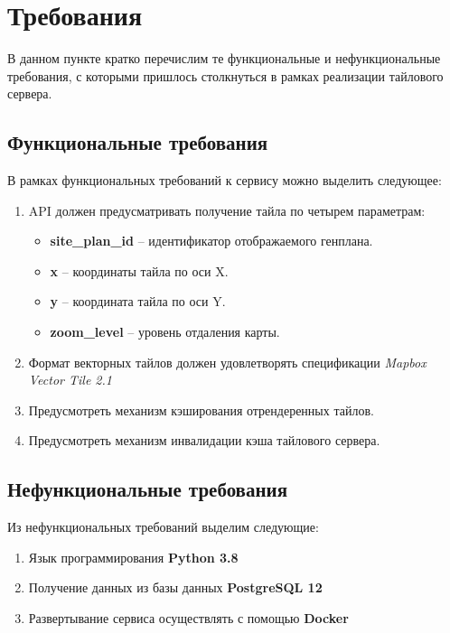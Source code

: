 \section*{\Large{Требования}}

В данном пункте кратко перечислим те функциональные и нефункциональные требования, с которыми пришлось столкнуться
в рамках реализации тайлового сервера.

\subsection*{\large{Функциональные требования}}

В рамках функциональных требований к сервису можно выделить следующее:
\begin{enumerate}
    \item API должен предусматривать получение тайла по четырем параметрам:
    \begin{itemize}
        \item \textbf{site\_plan\_id} -- идентификатор отображаемого генплана.
        \item \textbf{x} -- координаты тайла по оси X.
        \item \textbf{y} -- координата тайла по оси Y.
        \item \textbf{zoom\_level} -- уровень отдаления карты.
    \end{itemize}
    \item Формат векторных тайлов должен удовлетворять спецификации \textit{Mapbox Vector Tile 2.1}
    \item Предусмотреть механизм кэширования отрендеренных тайлов.
    \item Предусмотреть механизм инвалидации кэша тайлового сервера.
\end{enumerate}

\subsection*{\large{Нефункциональные требования}}

Из нефункциональных требований выделим следующие:
\begin{enumerate}
    \item Язык программирования \textbf{Python 3.8}
    \item Получение данных из базы данных \textbf{PostgreSQL 12}
    \item Развертывание сервиса осуществлять с помощью \textbf{Docker}
\end{enumerate}
